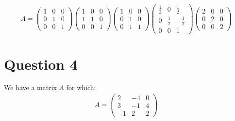 \documentclass[11pt]{article}
\begin{document}
\begin{align*}
A=
\left(\begin{array}{ccc}
1 & 0 & 0 \\
0 & 1 & 0 \\
0 & 0 & 1
\end{array}\right)
\left(\begin{array}{ccc}
1 & 0 & 0 \\
1 & 1 & 0 \\
0 & 0 & 1
\end{array}\right)
\left(\begin{array}{ccc}
1 & 0 & 0 \\
0 & 1 & 0 \\
0 & 1 & 1
\end{array}\right)
\left(\begin{array}{ccc}
\frac{1}{2} & 0 & \frac{1}{2} \\
0 & \frac{1}{2} & -\frac{1}{2} \\
0 & 0 & 1
\end{array}\right)
\left(\begin{array}{ccc}
2 & 0 & 0 \\
0 & 2 & 0 \\
0 & 0 & 2
\end{array}\right)
\end{align*}

\newpage

\section{Question 4}
We have a matrix $A$ for which: 
\begin{align*}
A=
\left(\begin{array}{ccc}
2 & -4 & 0 \\
3 & -1 & 4 \\
-1 & 2 & 2
\end{array}\right)
\end{align*}
\end{document}
